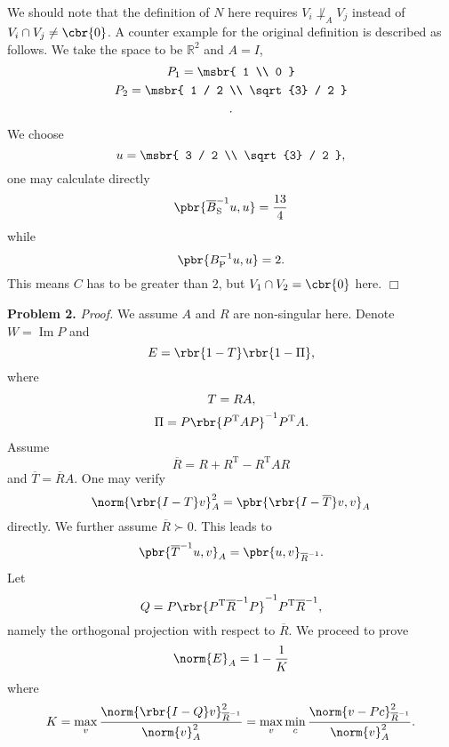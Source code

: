 \documentclass[english, nochinese]{pnote}
\DeclareMathOperator\opim{\mathrm{Im}}
\begin{document}
We should note that the definition of $N$ here requires $ V_i \not\perp_A V_j $ instead of $ V_i \cap V_j \neq \cbr{0} $. A counter example for the original definition is described as follows. We take the space to be $\mathbb{R}^2$ and $ A = I $,
\begin{gather}
P_1 = \msbr{ 1 \\ 0 } \\
P_2 = \msbr{ 1 / 2 \\ \sqrt{3} / 2 } \\.
\end{gather}
We choose
\begin{equation}
u = \msbr{ 3 / 2 \\ \sqrt{3} / 2 },
\end{equation}
one may calculate directly
\begin{equation}
\pbr{ \overline{B}_{\text{S}}^{-1} u, u } = \frac{13}{4}
\end{equation}
while
\begin{equation}
\pbr{ B_{\text{P}}^{-1} u, u } = 2.
\end{equation}
This means $C$ has to be greater than $2$, but $ V_1 \cap V_2 = \cbr{0} $ here.
\hfill$\Box$

\textbf{Problem 2.} \textit{Proof.} We assume $A$ and $R$ are non-singular here. Denote $ W = \opim P $ and
\begin{equation}
E = \rbr{ 1 - T } \rbr{ 1 - \Pi },
\end{equation}
where
\begin{gather}
T = R A, \\
\Pi = P \rbr{ P^{\text{T}} A P }^{-1} P^{\text{T}} A.
\end{gather}
Assume
\begin{equation}
\overline{R} = R + R^{\text{T}} - R^{\text{T}} A R
\end{equation}
and $ \overline{T} = \overline{R} A $. One may verify
\begin{equation}
\norm{ \rbr{ I - T } v }_A^2 = \pbr{ \rbr{ I - \overline{T} } v, v }_A
\end{equation}
directly. We further assume $ \overline{R} \succ 0 $. This leads to
\begin{equation}
\pbr{ \overline{T}^{-1} u, v }_A = \pbr{ u, v }_{\overline{R}^{-1}}.
\end{equation}
Let
\begin{equation}
Q = P \rbr{ P^{\text{T}} \overline{R}^{-1} P }^{-1} P^{\text{T}} \overline{R}^{-1},
\end{equation}
namely the orthogonal projection with respect to $\overline{R}$. We proceed to prove
\begin{equation}
\norm{E}_A = 1 - \frac{1}{K}
\end{equation}
where
\begin{equation}
K = \max_v \frac{\norm{ \rbr{ I - Q } v  }_{\overline{R}^{-1}}^2}{\norm{v}_A^2} = \max_v \min_c \frac{\norm{ v - P c  }_{\overline{R}^{-1}}^2}{\norm{v}_A^2}.
\end{equation}
\end{document}
